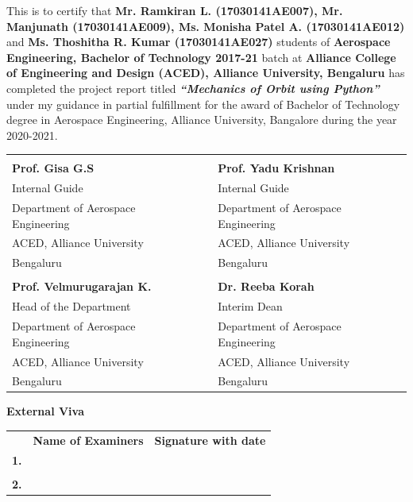 \documentclass[12pt]{article}
\begin{document}
This is to certify that \textbf{Mr. Ramkiran L. (17030141AE007), Mr. Manjunath (17030141AE009), Ms. Monisha Patel A. (17030141AE012)} and \textbf{Ms. Thoshitha R. Kumar (17030141AE027)} students of \textbf{Aerospace Engineering, Bachelor of Technology 2017-21} batch at \textbf{Alliance College of Engineering and Design (ACED), Alliance University, Bengaluru} has completed the project report titled \textit{\textbf{\enquote{Mechanics of Orbit using Python}}} under my guidance in partial fulfillment for the award of Bachelor of Technology degree in Aerospace Engineering, Alliance University, Bangalore during the year 2020-2021. \vspace{1em}\\
\begin{center}
\begin{tabular}{K{7cm} K{0.5cm} K{7cm}}
\underline{\hspace{2.9cm}} & & \underline{\hspace{4.3cm}} \\ 
\textbf{Prof. Gisa G.S} & & \textbf{Prof. Yadu Krishnan} \vspace{1em}\\ 
Internal Guide & &  Internal Guide\\ 
Department of Aerospace Engineering & & Department of Aerospace Engineering \\
ACED, Alliance University & & ACED, Alliance University \\ 
Bengaluru & & Bengaluru \vspace{3em}\\ 
\underline{\hspace{5cm}}&&\underline{\hspace{3.5cm}}\\ 
\textbf{Prof. Velmurugarajan K.}&&\textbf{Dr. Reeba Korah}\vspace{1em} \\ 
Head of the Department&&Interim Dean \\ 
Department of Aerospace Engineering&&Department of Aerospace Engineering\\
ACED, Alliance University&&ACED, Alliance University\\ 
Bengaluru&&Bengaluru\vspace{2em}\\ 
\end{tabular} 
\end{center}
\textbf{External Viva}
\begin{center}
\begin{tabular}{c K{7cm} K{7cm}}
 & \textbf{Name of Examiners} & \textbf{Signature with date} \\
\textbf{1.} & & \\ 
&&\\
\textbf{2.} & & \\
\end{tabular}
\end{center}
\end{document}

